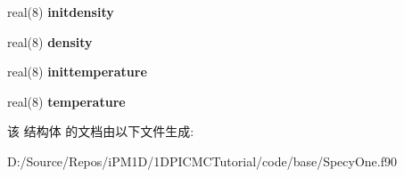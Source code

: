 \begin{DoxyCompactItemize}
real(8) {\bfseries initdensity}
\item 
\mbox{\label{structmodulespecyone_1_1gasone_a4ea25b6bd70afd4c31ab103429e19519}} 
real(8) {\bfseries density}
\item 
\mbox{\label{structmodulespecyone_1_1gasone_a71cf9f56a94791552dda8f71a3a988c6}} 
real(8) {\bfseries inittemperature}
\item 
\mbox{\label{structmodulespecyone_1_1gasone_a0a2b3b28f1dfdf0501333e8eac7aac3a}} 
real(8) {\bfseries temperature}
\end{DoxyCompactItemize}


该 结构体 的文档由以下文件生成\+:\begin{DoxyCompactItemize}
\item 
D\+:/\+Source/\+Repos/i\+P\+M1\+D/1\+D\+P\+I\+C\+M\+C\+Tutorial/code/base/Specy\+One.\+f90\end{DoxyCompactItemize}
